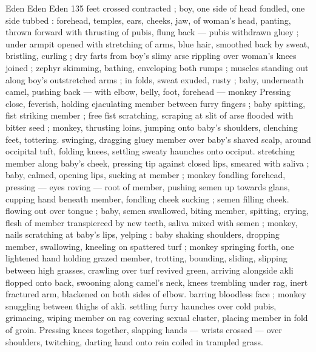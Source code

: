 Eden Eden Eden 135
feet crossed contracted ; boy, one side of head fondled, one side
tubbed : forehead, temples, ears, cheeks, jaw, of woman's head,
panting, thrown forward with thrusting of pubis, flung back — pubis
withdrawn gluey ; under armpit opened with stretching of arms, blue
hair, smoothed back by sweat, bristling, curling ; dry farts from boy's
slimy arse rippling over woman's knees joined ; zephyr skimming,
bathing, enveloping both rumps ; muscles standing out along boy's
outstretched arms ; in folds, sweat exuded, rusty ; baby, underneath
camel, pushing back — with elbow, belly, foot, forehead — monkey
Pressing close, feverish, holding ejaculating member between furry
fingers ; baby spitting, fist striking member ; free fist scratching,
scraping at slit of arse flooded with bitter seed ; monkey, thrusting
loins, jumping onto baby's shoulders, clenching feet, tottering.
swinging, dragging gluey member over baby's shaved scalp, around
occipital tuft, folding knees, settling sweaty haunches onto occiput.
stretching member along baby's cheek, pressing tip against closed
lips, smeared with saliva ; baby, calmed, opening lips, sucking at
member ; monkey fondling forehead, pressing — eyes roving —
root of member, pushing semen up towards glans, cupping hand
beneath member, fondling cheek sucking ; semen filling cheek.
flowing out over tongue ; baby, semen swallowed, biting member,
spitting, crying, flesh of member transpierced by new teeth, saliva
mixed with semen ; monkey, nails scratching at baby's lips, yelping :
baby shaking shoulders, dropping member, swallowing, kneeling on
spattered turf ; monkey springing forth, one lightened hand holding
grazed member, trotting, bounding, sliding, slipping between high
grasses, crawling over turf revived green, arriving alongside akli
flopped onto back, swooning along camel's neck, knees trembling
under rag, inert fractured arm, blackened on both sides of elbow.
barring bloodless face ; monkey snuggling between thighs of akli.
settling furry haunches over cold pubis, grimacing, wiping member
on rag covering sexual cluster, placing member in fold of groin.
Pressing knees together, slapping hands — wrists crossed — over
shoulders, twitching, darting hand onto rein coiled in trampled grass.

